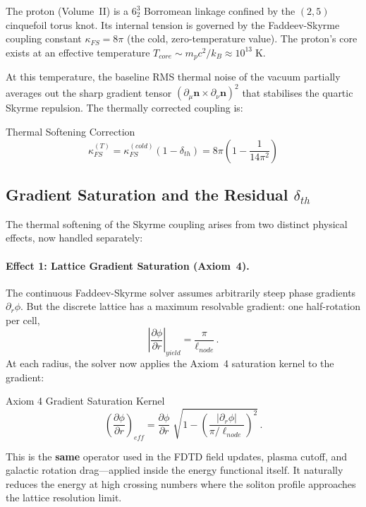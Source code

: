 The proton (Volume~II) is a $6_2^3$ Borromean linkage confined by the $(2,5)$ cinquefoil torus knot. Its internal tension is governed by the Faddeev-Skyrme coupling constant $\kappa_{FS} = 8\pi$ (the cold, zero-temperature value). The proton's core exists at an effective temperature $T_{core} \sim m_p c^2 / k_B \approx 10^{13}\;\text{K}$.

At this temperature, the baseline RMS thermal noise of the vacuum partially averages out the sharp gradient tensor $(\partial_\mu \mathbf{n} \times \partial_\nu \mathbf{n})^2$ that stabilises the quartic Skyrme repulsion. The thermally corrected coupling is:
\begin{resultbox}{Thermal Softening Correction}
\begin{equation}
    \kappa_{FS}^{(T)} = \kappa_{FS}^{(cold)} (1 - \delta_{th}) = 8\pi \left(1 - \frac{1}{14\pi^2}\right)
    \label{eq:thermal_kappa}
\end{equation}
\end{resultbox}

\subsection{Gradient Saturation and the Residual $\delta_{th}$}

The thermal softening of the Skyrme coupling arises from two distinct physical effects, now handled separately:

\paragraph{Effect 1: Lattice Gradient Saturation (Axiom~4).}
The continuous Faddeev-Skyrme solver assumes arbitrarily steep phase gradients $\partial_r \phi$. But the discrete lattice has a maximum resolvable gradient: one half-rotation per cell,
\begin{equation}
    \left|\frac{\partial\phi}{\partial r}\right|_{yield} = \frac{\pi}{\ell_{node}}\,.
\end{equation}
At each radius, the solver now applies the Axiom~4 saturation kernel to the gradient:
\begin{resultbox}{Axiom 4 Gradient Saturation Kernel}
\begin{equation}
    \left(\frac{\partial\phi}{\partial r}\right)_{\!eff}
    = \frac{\partial\phi}{\partial r}\;\sqrt{1 - \left(\frac{|\partial_r\phi|}{\pi/\ell_{node}}\right)^{\!2}}\,.
\end{equation}
\end{resultbox}
This is the \textbf{same} operator used in the FDTD field updates, plasma cutoff, and galactic rotation drag---applied inside the energy functional itself.  It naturally reduces the energy at high crossing numbers where the soliton profile approaches the lattice resolution limit.


